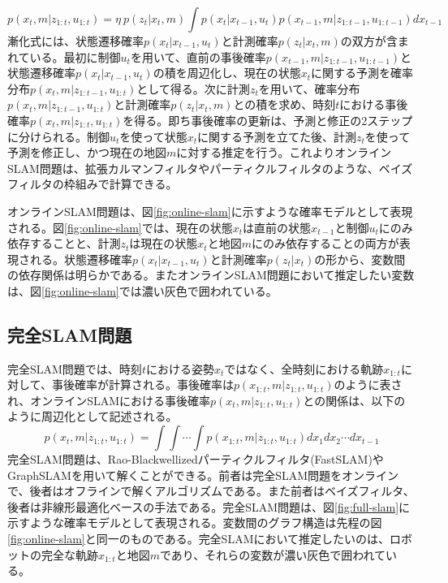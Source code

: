 \documentclass[dvipdfmx,a4paper]{jsarticle}
\begin{document}
\begin{equation}
	p(x_t, m | z_{1 : t}, u_{1 : t}) = \eta \ p(z_t | x_t, m) \int p(x_t | x_{t - 1}, u_t) p(x_{t - 1}, m | z_{1 : t - 1}, u_{1 : t - 1}) dx_{t - 1}
\end{equation}
漸化式には、状態遷移確率$p(x_t | x_{t - 1}, u_t)$と計測確率$p(z_t | x_t, m)$の双方が含まれている。最初に制御$u_t$を用いて、直前の事後確率$p(x_{t - 1}, m | z_{1 : t - 1}, u_{1 : t - 1})$と状態遷移確率$p(x_t | x_{t - 1}, u_t)$の積を周辺化し、現在の状態$x_t$に関する予測を確率分布$p(x_t, m | z_{1 : t - 1}, u_{1 : t})$として得る。次に計測$z_t$を用いて、確率分布$p(x_t, m | z_{1 : t - 1}, u_{1 : t})$と計測確率$p(z_t | x_t, m)$との積を求め、時刻$t$における事後確率$p(x_t, m | z_{1 : t}, u_{1 : t})$を得る。即ち事後確率の更新は、予測と修正の2ステップに分けられる。制御$u_t$を使って状態$x_t$に関する予測を立てた後、計測$z_t$を使って予測を修正し、かつ現在の地図$m$に対する推定を行う。これよりオンラインSLAM問題は、拡張カルマンフィルタやパーティクルフィルタのような、ベイズフィルタの枠組みで計算できる。\newline

オンラインSLAM問題は、図\ref{fig:online-slam}に示すような確率モデルとして表現される。図\ref{fig:online-slam}では、現在の状態$x_t$は直前の状態$x_{t - 1}$と制御$u_t$にのみ依存することと、計測$z_t$は現在の状態$x_t$と地図$m$にのみ依存することの両方が表現される。状態遷移確率$p(x_t | x_{t - 1}, u_t)$と計測確率$p(z_t | x_t)$の形から、変数間の依存関係は明らかである。またオンラインSLAM問題において推定したい変数は、図\ref{fig:online-slam}では濃い灰色で囲われている。

\subsection{完全SLAM問題}
完全SLAM問題では、時刻$t$における姿勢$x_t$ではなく、全時刻における軌跡$x_{1 : t}$に対して、事後確率が計算される。事後確率は$p(x_{1 : t}, m | z_{1 : t}, u_{1 : t})$のように表され、オンラインSLAMにおける事後確率$p(x_t, m | z_{1 : t}, u_{1 : t})$との関係は、以下のように周辺化として記述される。
\begin{equation}
	p(x_t, m | z_{1 : t}, u_{1 : t}) = \int \int \cdots \int p(x_{1 : t}, m | z_{1 : t}, u_{1 : t}) dx_1 dx_2 \cdots dx_{t - 1}
\end{equation}
完全SLAM問題は、Rao-Blackwellizedパーティクルフィルタ(FastSLAM)やGraphSLAMを用いて解くことができる。前者は完全SLAM問題をオンラインで、後者はオフラインで解くアルゴリズムである。また前者はベイズフィルタ、後者は非線形最適化ベースの手法である。完全SLAM問題は、図\ref{fig:full-slam}に示すような確率モデルとして表現される。変数間のグラフ構造は先程の図\ref{fig:online-slam}と同一のものである。完全SLAMにおいて推定したいのは、ロボットの完全な軌跡$x_{1 : t}$と地図$m$であり、それらの変数が濃い灰色で囲われている。\newline
\end{document}
